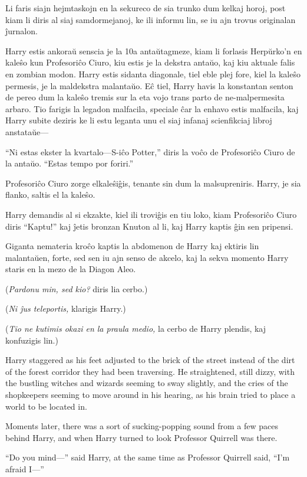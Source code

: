 Li faris siajn hejmtaskojn en la sekureco de sia trunko dum kelkaj horoj, post
kiam li diris al siaj samdormejanoj, ke ili informu lin, se iu ajn trovus
originalan ĵurnalon.

Harry estis ankoraŭ senscia je la 10a antaŭtagmeze, kiam li forlasis
Herpŭrko'n en kaleŝo kun Profesoriĉo Ciuro, kiu estis je la dekstra
antaŭo, kaj kiu aktuale falis en zombian modon. Harry estis sidanta
diagonale, tiel eble plej fore, kiel la kaleŝo permesis, je la
maldekstra malantaŭo. Eĉ tiel, Harry havis la konstantan senton de
pereo dum la kaleŝo tremis sur la eta vojo trans parto de
ne-malpermesita arbaro. Tio farigis la legadon malfacila, speciale ĉar
la enhavo estis malfacila, kaj Harry subite deziris ke li estu leganta
unu el siaj infanaj scienfikciaj libroj anstataŭe—

``Ni estas ekster la kvartalo—S-iĉo Potter,'' diris la voĉo de
Profesoriĉo Ciuro de la antaŭo. ``Estas tempo por foriri.''

Profesoriĉo Ciuro zorge elkaleŝiĝis, tenante sin dum la malsupreniris. Harry, je sia flanko, saltis el la kaleŝo.

Harry demandis al si ekzakte, kiel ili troviĝis en tiu loko, kiam
Profesoriĉo Ciuro diris ``Kaptu!'' kaj ĵetis bronzan Knuton al li, kaj
Harry kaptis ĝin sen pripensi.

Giganta nemateria kroĉo kaptis la abdomenon de Harry kaj ektiris lin
malantaŭen, forte, sed sen iu ajn senso de akcelo, kaj la sekva
momento Harry staris en la mezo de la Diagon Aleo.

(\emph{Pardonu min, sed kio?} diris lia cerbo.)

(\emph{Ni ĵus teleportis,} klarigis Harry.)

(\emph{Tio ne kutimis okazi en la praula medio,} la cerbo de Harry plendis, kaj konfuzigis lin.)

Harry staggered as his feet adjusted to the brick of the street instead of the dirt of the forest corridor they had been traversing. He straightened, still dizzy, with the bustling witches and wizards seeming to sway slightly, and the cries of the shopkeepers seeming to move around in his hearing, as his brain tried to place a world to be located in.

Moments later, there was a sort of sucking-popping sound from a few paces behind Harry, and when Harry turned to look Professor Quirrell was there.

“Do you mind—” said Harry, at the same time as Professor Quirrell said, “I’m afraid I—”

